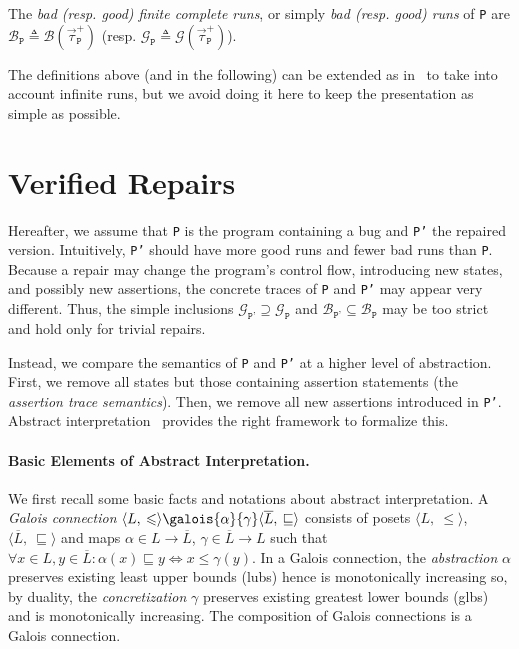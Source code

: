 \documentclass[10pt]{sigplanconf}
\newcommand{\code}[1]{\texttt{#1}}
\newcommand{\ltuple}[1]{\langle#1,\allowbreak}
\newcommand{\rtuple}[1]{\:#1\rangle}
\newcommand{\pair}[2]{\ltuple{#1}\rtuple{#2}}
\begin{document}
The \emph{bad (resp. good) finite complete runs}, or simply \emph{bad (resp. good) runs} of \code{P} are $\mathcal{B}_\code{P} \triangleq \mathcal{B}(\vec{\tau}^+_\code{P})$ (resp. $\mathcal{G}_\code{P} \triangleq \mathcal{G}( \vec{\tau}^+_\code{P})$).

The definitions above (and in the following) can be extended as in~\cite{Cousot-TCS02} to take into account infinite runs, but we avoid doing it here to keep the presentation as simple as possible. 


\section{Verified Repairs}
\label{sec:verifiedrepairs}
Hereafter, we assume that \code{P} is the program containing a bug and
\code{P'} the repaired version.  Intuitively, \code{P'} should have
more good runs and fewer bad runs than \code{P}.  Because a repair may
change the program's control flow, introducing new states, and
possibly new assertions, the concrete traces of
\code{P} and \code{P'} may appear very different. Thus,
the simple inclusions $\mathcal{G}_\code{P'} \supseteq
\mathcal{G}_\code{P}$ and $\mathcal{B}_\code{P'} \subseteq
\mathcal{B}_\code{P}$ may be too strict and hold only for trivial
repairs.

Instead, we compare the semantics of \code{P} and
\code{P'} at a higher level of abstraction.  First, we remove
all states but those containing assertion statements (the {\em
assertion trace semantics}).  Then, we remove all new assertions
introduced in \code{P'}.
Abstract interpretation~\cite{CousotCousot77} provides the right framework to formalize this.


\paragraph{Basic Elements of Abstract Interpretation.} 
We first recall some basic facts and notations about abstract interpretation.
A \emph{Galois connection} $\pair{L}{\leqslant}\galois{{\alpha}}{{\gamma}}\pair{\overline{L}}{\sqsubseteq}$ consists of posets $\pair{L}{\leqslant}$, $\pair{\overline{L}}{\sqsubseteq}$ and maps $\alpha\in L\rightarrow\overline{L}$, $\gamma\in\overline{L}\rightarrow L$ such that $\forall x\in L,y\in\overline{L}: \alpha(x) \sqsubseteq y\iff x\leqslant\gamma(y)$. 
In a Galois connection, the \emph{abstraction} $\alpha$ preserves existing least upper bounds (lubs) hence is monotonically increasing so, by duality, the \emph{concretization}  $\gamma$ preserves existing greatest lower bounds (glbs) and is monotonically increasing. 
The composition of Galois connections is a Galois connection.
\end{document}
